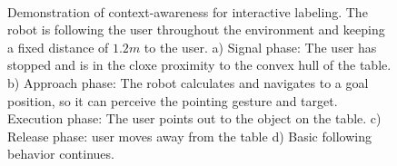 \documentclass[3p]{elsarticle}
\begin{document}
\begin{figure}[h]
\centering
%
          \\
    \caption{Demonstration of context-awareness for interactive labeling. The robot is following the user throughout the environment and keeping a fixed distance of $1.2m$ to the user. a) Signal phase: The user has stopped and is in the cloxe proximity to the convex hull of the table. b) Approach phase: The robot calculates and navigates to a goal position, so it can perceive the pointing gesture and target. Execution phase: The user points out to the object on the table. c) Release phase: user moves away from the table d) Basic following behavior continues.}
   \label{fig:situtation_aware_landmark_labeling}
\end{figure}
\end{document}
